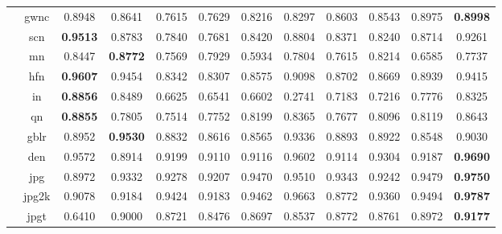 \documentclass[11pt,a4paper]{article}
\begin{document}
\begin{table}[!htb]
\begin{scriptsize}
{\begin{threeparttable}
\begin{tabular}{*{12}{c}}
& gwnc & 0.8948 & 0.8641 & \cellcolor{green!25}0.7615 & \cellcolor{green!25}0.7629 & \cellcolor{green!25}0.8216 & \cellcolor{green!25}0.8297 & 0.8603 & 0.8543 & 0.8975 & \textbf{0.8998}\\
& scn & \textbf{0.9513} & \cellcolor{green!25}0.8783 & \cellcolor{green!25}0.7840 & \cellcolor{green!25}0.7681 & \cellcolor{green!25}0.8420 & \cellcolor{green!25}0.8804 & \cellcolor{green!25}0.8371 & \cellcolor{green!25}0.8240 & \cellcolor{green!25}0.8714 & 0.9261\\
& mn & 0.8447 & \cellcolor{red!25}\textbf{0.8772} & 0.7569 & 0.7929 & \cellcolor{green!25}0.5934 & 0.7804 & 0.7615 & 0.8214 & 0.6585 & 0.7737\\
& hfn & \textbf{0.9607} & 0.9454 & \cellcolor{green!25}0.8342 & \cellcolor{green!25}0.8307 & \cellcolor{green!25}0.8575 & 0.9098 & \cellcolor{green!25}0.8702 & \cellcolor{green!25}0.8669 & \cellcolor{green!25}0.8939 & 0.9415\\
& in & \textbf{0.8856} & 0.8489 & \cellcolor{green!25}0.6625 & \cellcolor{green!25}0.6541 & \cellcolor{green!25}0.6602 & \cellcolor{green!25}0.2741 & \cellcolor{green!25}0.7183 & \cellcolor{green!25}0.7216 & 0.7776 & 0.8325\\
& qn & \textbf{0.8855} & \cellcolor{green!25}0.7805 & \cellcolor{green!25}0.7514 & \cellcolor{green!25}0.7752 & 0.8199 & 0.8365 & \cellcolor{green!25}0.7677 & 0.8096 & 0.8119 & 0.8643\\
& gblr & 0.8952 & \cellcolor{red!25}\textbf{0.9530} & 0.8832 & 0.8616 & 0.8565 & 0.9336 & 0.8893 & 0.8922 & 0.8548 & 0.9030\\
& den & 0.9572 & \cellcolor{green!25}0.8914 & \cellcolor{green!25}0.9199 & \cellcolor{green!25}0.9110 & \cellcolor{green!25}0.9116 & 0.9602 & \cellcolor{green!25}0.9114 & \cellcolor{green!25}0.9304 & \cellcolor{green!25}0.9187 & \textbf{0.9690}\\
& jpg & \cellcolor{green!25}0.8972 & \cellcolor{green!25}0.9332 & \cellcolor{green!25}0.9278 & \cellcolor{green!25}0.9207 & \cellcolor{green!25}0.9470 & \cellcolor{green!25}0.9510 & \cellcolor{green!25}0.9343 & \cellcolor{green!25}0.9242 & \cellcolor{green!25}0.9479 & \textbf{0.9750}\\
& jpg2k & \cellcolor{green!25}0.9078 & \cellcolor{green!25}0.9184 & \cellcolor{green!25}0.9424 & \cellcolor{green!25}0.9183 & \cellcolor{green!25}0.9462 & 0.9663 & \cellcolor{green!25}0.8772 & \cellcolor{green!25}0.9360 & \cellcolor{green!25}0.9494 & \textbf{0.9787}\\
& jpgt & \cellcolor{green!25}0.6410 & 0.9000 & 0.8721 & \cellcolor{green!25}0.8476 & 0.8697 & \cellcolor{green!25}0.8537 & 0.8772 & 0.8761 & 0.8972 & \textbf{0.9177}\\

\end{tabular}
\end{threeparttable}}
\end{scriptsize}
\end{table}
\end{document}
